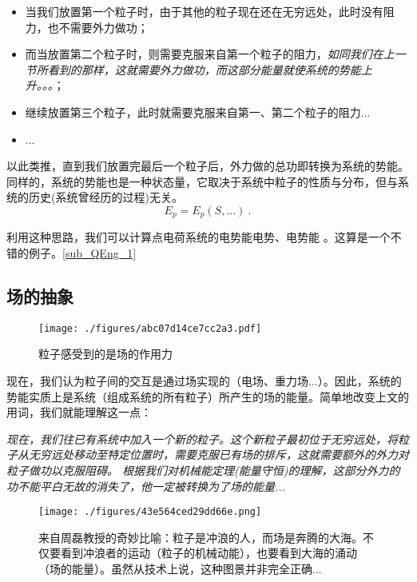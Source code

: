 \begin{itemize}
\item 当我们放置第一个粒子时，由于其他的粒子现在还在无穷远处，此时没有阻力，也不需要外力做功；
\item 而当放置第二个粒子时，则需要克服来自第一个粒子的阻力，\textsl{如同我们在上一节所看到的那样，这就需要外力做功，而这部分能量就使系统的势能上升。。。}；
\item 继续放置第三个粒子，此时就需要克服来自第一、第二个粒子的阻力...
\item ...
\end{itemize}
以此类推，直到我们放置完最后一个粒子后，外力做的总功即转换为系统的势能。
同样的，系统的势能也是一种状态量，它取决于系统中粒子的性质与分布，但与系统的历史(系统曾经历的过程)无关。
$$E_p=E_p(S,...)~.$$

利用这种思路，我们可以计算点电荷系统的电势能电势、电势能 。这算是一个不错的例子。\autoref{sub_QEng_1}~

\subsection{场的抽象}
\begin{figure}[ht]
\centering
\texttt{[image: ./figures/abc07d14ce7cc2a3.pdf]}
\caption{粒子感受到的是场的作用力} \label{fig_POTENT_3}
\end{figure}
现在，我们认为粒子间的交互是通过场实现的（电场、重力场...）。因此，系统的势能实质上是系统（组成系统的所有粒子）所产生的场的能量。简单地改变上文的用词，我们就能理解这一点：

\textsl{现在，我们往已有系统中加入一个新的粒子。这个新粒子最初位于无穷远处，将粒子从无穷远处移动至特定位置时，需要克服已有场的排斥，这就需要额外的外力对粒子做功以克服阻碍。 根据我们对机械能定理(能量守恒)的理解，这部分外力的功不能平白无故的消失了，他一定被转换为了场的能量...}

\begin{figure}[ht]
\centering
\texttt{[image: ./figures/43e564ced29dd66e.png]}
\caption{来自周磊教授的奇妙比喻：粒子是冲浪的人，而场是奔腾的大海。不仅要看到冲浪者的运动（粒子的机械动能），也要看到大海的涌动（场的能量）。虽然从技术上说，这种图景并非完全正确...} \label{fig_POTENT_5}
\end{figure}
